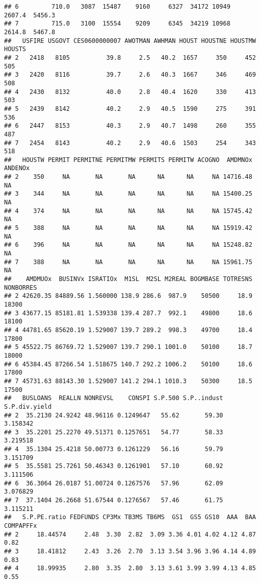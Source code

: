 \documentclass[
]{article}
\begin{document}
\begin{verbatim}
## 6         710.0   3087  15487    9160     6327  34172 10949   2607.4  5456.3
## 7         715.0   3100  15554    9209     6345  34219 10968   2614.8  5467.8
##   USFIRE USGOVT CES0600000007 AWOTMAN AWHMAN HOUST HOUSTNE HOUSTMW HOUSTS
## 2   2418   8105          39.8     2.5   40.2  1657     350     452    505
## 3   2420   8116          39.7     2.6   40.3  1667     346     469    508
## 4   2430   8132          40.0     2.8   40.4  1620     330     413    503
## 5   2439   8142          40.2     2.9   40.5  1590     275     391    536
## 6   2447   8153          40.3     2.9   40.7  1498     260     355    487
## 7   2454   8143          40.2     2.9   40.6  1503     254     343    518
##   HOUSTW PERMIT PERMITNE PERMITMW PERMITS PERMITW ACOGNO  AMDMNOx ANDENOx
## 2    350     NA       NA       NA      NA      NA     NA 14716.48      NA
## 3    344     NA       NA       NA      NA      NA     NA 15400.25      NA
## 4    374     NA       NA       NA      NA      NA     NA 15745.42      NA
## 5    388     NA       NA       NA      NA      NA     NA 15919.42      NA
## 6    396     NA       NA       NA      NA      NA     NA 15248.82      NA
## 7    388     NA       NA       NA      NA      NA     NA 15961.75      NA
##    AMDMUOx  BUSINVx ISRATIOx  M1SL  M2SL M2REAL BOGMBASE TOTRESNS NONBORRES
## 2 42620.35 84889.56 1.560000 138.9 286.6  987.9    50500     18.9     18300
## 3 43677.15 85181.81 1.539338 139.4 287.7  992.1    49800     18.6     18100
## 4 44781.65 85620.19 1.529007 139.7 289.2  998.3    49700     18.4     17800
## 5 45522.75 86769.72 1.529007 139.7 290.1 1001.0    50100     18.7     18000
## 6 45384.45 87266.54 1.518675 140.7 292.2 1006.2    50100     18.6     17800
## 7 45731.63 88143.30 1.529007 141.2 294.1 1010.3    50300     18.5     17500
##   BUSLOANS  REALLN NONREVSL    CONSPI S.P.500 S.P..indust S.P.div.yield
## 2  35.2130 24.9242 48.96116 0.1249647   55.62       59.30      3.158342
## 3  35.2201 25.2270 49.51371 0.1257651   54.77       58.33      3.219518
## 4  35.1304 25.4218 50.00773 0.1261229   56.16       59.79      3.151709
## 5  35.5581 25.7261 50.46343 0.1261901   57.10       60.92      3.111506
## 6  36.3064 26.0187 51.00724 0.1267576   57.96       62.09      3.076829
## 7  37.1404 26.2668 51.67544 0.1276567   57.46       61.75      3.115211
##   S.P.PE.ratio FEDFUNDS CP3Mx TB3MS TB6MS  GS1  GS5 GS10  AAA  BAA COMPAPFFx
## 2     18.44574     2.48  3.30  2.82  3.09 3.36 4.01 4.02 4.12 4.87      0.82
## 3     18.41812     2.43  3.26  2.70  3.13 3.54 3.96 3.96 4.14 4.89      0.83
## 4     18.99935     2.80  3.35  2.80  3.13 3.61 3.99 3.99 4.13 4.85      0.55

\end{verbatim}
\end{document}
